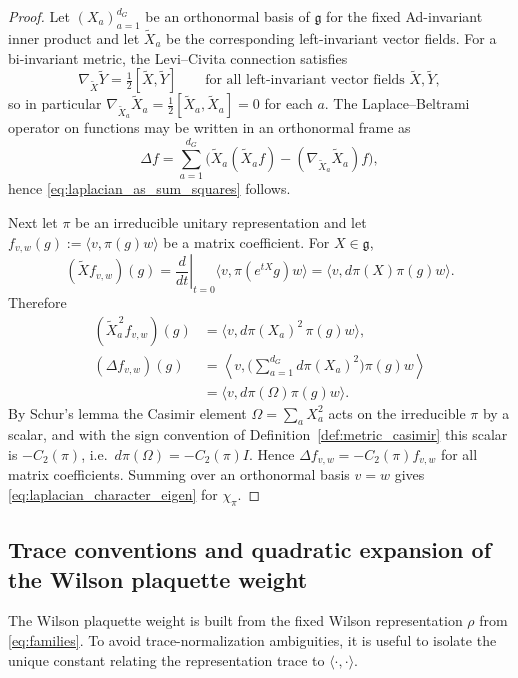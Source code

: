 \begin{proof}
Let $(X_a)_{a=1}^{d_G}$ be an orthonormal basis of $\mathfrak g$ for the fixed Ad-invariant inner product and let $\widetilde X_a$
be the corresponding left-invariant vector fields.
For a bi-invariant metric, the Levi--Civita connection satisfies
\[
\nabla_{\widetilde X}\widetilde Y=\tfrac12[\widetilde X,\widetilde Y]
\qquad\text{for all left-invariant vector fields }\widetilde X,\widetilde Y,
\]
so in particular $\nabla_{\widetilde X_a}\widetilde X_a=\tfrac12[\widetilde X_a,\widetilde X_a]=0$ for each $a$.
The Laplace--Beltrami operator on functions may be written in an orthonormal frame as
\[
\Delta f=\sum_{a=1}^{d_G}\big(\widetilde X_a(\widetilde X_a f)-(\nabla_{\widetilde X_a}\widetilde X_a)f\big),
\]
hence \eqref{eq:laplacian_as_sum_squares} follows.

Next let $\pi$ be an irreducible unitary representation and let $f_{v,w}(g):=\langle v,\pi(g)w\rangle$ be a matrix coefficient.
For $X\in\mathfrak g$,
\[
(\widetilde X f_{v,w})(g)
=\left.\frac{d}{dt}\right|_{t=0}\langle v,\pi(e^{tX}g)w\rangle
=\langle v,d\pi(X)\pi(g)w\rangle.
\]
Therefore
\[
\begin{aligned}
(\widetilde X_a^{\,2} f_{v,w})(g)
&=\langle v,d\pi(X_a)^2\,\pi(g)w\rangle,\\
(\Delta f_{v,w})(g)
&=\left\langle v,\Big(\sum_{a=1}^{d_G}d\pi(X_a)^2\Big)\pi(g)w\right\rangle\\
&=\langle v,d\pi(\Omega)\pi(g)w\rangle.
\end{aligned}
\]
By Schur's lemma the Casimir element $\Omega=\sum_a X_a^2$ acts on the irreducible $\pi$ by a scalar, and with the sign convention
of Definition~\ref{def:metric_casimir} this scalar is $-C_2(\pi)$, i.e.\ $d\pi(\Omega)=-C_2(\pi)I$.
Hence $\Delta f_{v,w}=-C_2(\pi)f_{v,w}$ for all matrix coefficients.
Summing over an orthonormal basis $v=w$ gives \eqref{eq:laplacian_character_eigen} for $\chi_\pi$.
\end{proof}

\subsection{Trace conventions and quadratic expansion of the Wilson plaquette weight}

The Wilson plaquette weight is built from the fixed Wilson representation $\rho$ from \eqref{eq:families}.
To avoid trace-normalization ambiguities, it is useful to isolate the unique constant relating the representation trace to
$\langle\cdot,\cdot\rangle$.


